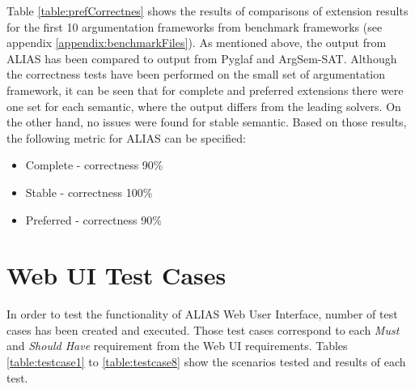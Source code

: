 Table \ref{table:prefCorrectnes} shows the results of comparisons of extension results for the first 10 argumentation frameworks from benchmark frameworks (see appendix \ref{appendix:benchmarkFiles}). As mentioned above, the output from ALIAS has been compared to output from Pyglaf and ArgSem-SAT. Although the correctness tests have been performed on the small set of argumentation framework, it can be seen that for complete and preferred extensions there were one set for each semantic, where the output differs from the leading solvers. On the other hand, no issues were found for stable semantic. Based on those results, the following metric for ALIAS can be specified:
\begin{itemize}
	\item Complete - correctness 90\%
	\item Stable - correctness 100\%
	\item Preferred - correctness 90\%
\end{itemize}


\section{Web UI Test Cases} \label{section:testCases}
In order to test the functionality of ALIAS Web User Interface, number of test cases has been created and executed. Those test cases correspond to each \textit{Must} and \textit{Should Have} requirement from the Web UI requirements. Tables \ref{table:testcase1} to \ref{table:testcase8} show the scenarios tested and results of each test.

